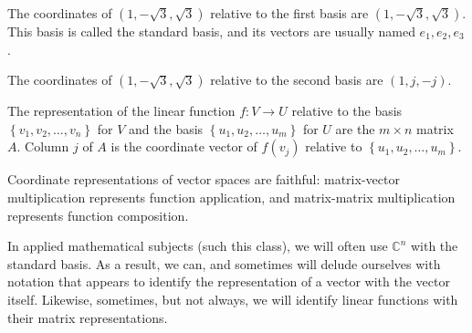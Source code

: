 The coordinates of \((1, -\sqrt{3}, \sqrt{3})\) relative to the first basis are \((1, -\sqrt{3}, \sqrt{3})\).
This basis is called the standard basis, and its vectors are usually named \(e_1, e_2, e_3\).

The coordinates of \((1, -\sqrt{3}, \sqrt{3})\) relative to the second basis are \((1, j, -j)\).

\begin{definition}
  The representation of the linear function
  \(f: V \to U\)
  relative to the basis
  \(\left\{v_1, v_2, \ldots, v_n\right\}\) for \(V\)
  and the basis
  \(\left\{u_1, u_2, \ldots, u_m\right\}\) for \(U\)
  are the \(m \times n\) matrix \(A\).
  Column \(j\) of \(A\) is the coordinate vector of \(f(v_j)\) relative to
  \(\left\{u_1, u_2, \ldots, u_m\right\}\).
\end{definition}

\begin{theorem}
  Coordinate representations of vector spaces are faithful:
  matrix-vector multiplication represents function application, and matrix-matrix multiplication represents function composition.
\end{theorem}

In applied mathematical subjects (such this class), we will often use \(\mathbb{C}^n\)
with the standard basis.
As a result, we can, and sometimes will delude ourselves with notation that appears to identify the representation of a vector with the vector itself.
Likewise, sometimes, but not always, we will identify linear functions with their matrix representations.

